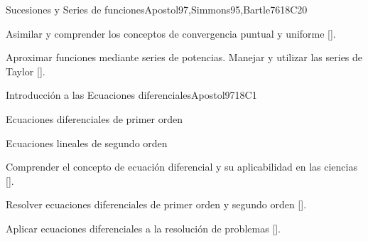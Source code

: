 \begin{syllabus}
\begin{unit}{}{Sucesiones y Series de funciones}{Apostol97,Simmons95,Bartle76}{18}{C20}
   \begin{learningoutcomes}
      \item Asimilar y comprender los conceptos de convergencia puntual y uniforme [\Usage].
      \item Aproximar funciones mediante series de potencias. Manejar y utilizar las series de Taylor [\Usage].
      \end{learningoutcomes}
\end{unit}

\begin{unit}{}{Introducción a las Ecuaciones diferenciales}{Apostol97}{18}{C1}
   \begin{topics}
      \item Ecuaciones diferenciales de primer orden
      \item Ecuaciones lineales de segundo orden
   \end{topics}

   \begin{learningoutcomes}
      \item Comprender el concepto de ecuación diferencial y su aplicabilidad en las ciencias [\Usage].
      \item Resolver ecuaciones diferenciales de primer orden y segundo orden [\Usage].
      \item Aplicar ecuaciones diferenciales a la resolución de problemas [\Usage].
      \end{learningoutcomes}
\end{unit}



\begin{coursebibliography}
\end{coursebibliography}

\end{syllabus}

%
